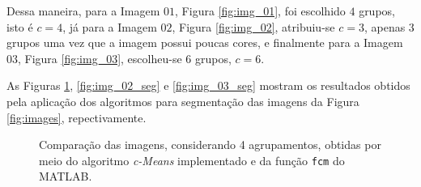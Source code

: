 \documentclass[12pt,a4paper]{article}
\numberwithin{equation}{section}
\begin{document}
Dessa maneira, para a Imagem $01$, Figura \ref{fig:img_01}, foi escolhido $4$ grupos, isto é $c=4$, já para a Imagem $02$, Figura \ref{fig:img_02}, atribuiu-se $c=3$, apenas $3$ grupos uma vez que a imagem possui poucas cores, e finalmente para a Imagem $03$, Figura \ref{fig:img_03}, escolheu-se $6$ grupos, $c=6$. 

As Figuras \ref{fig:img_01_seg}, \ref{fig:img_02_seg} e \ref{fig:img_03_seg} mostram os resultados obtidos pela aplicação dos algoritmos para segmentação das imagens da Figura \ref{fig:images}, repectivamente.
	
\begin{figure}[!htbp]
	\centering
	\caption{Comparação das imagens, considerando 4 agrupamentos, obtidas por meio do algoritmo \textit{c-Means} implementado e da função \texttt{fcm} do MATLAB.}
	\label{fig:img_01_seg}
\end{figure}
\end{document}
